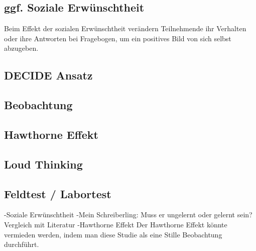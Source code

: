 \subsection{ggf. Soziale Erwünschtheit}
\grqq{}Beim Effekt der sozialen Erwünschtheit verändern Teilnehmende ihr Verhalten oder ihre Antworten bei Fragebogen, um ein positives Bild von sich selbst abzugeben.\glqq 

\subsection{DECIDE Ansatz}
\subsection{Beobachtung}
\subsection{Hawthorne Effekt}
\subsection{Loud Thinking}
\subsection{Feldtest / Labortest}

-Soziale Erwünschtheit
-Mein Schreiberling: Muss er ungelernt oder gelernt sein? Vergleich mit Literatur
-Hawthorne Effekt
Der Hawthorne Effekt könnte vermieden werden, indem man diese Studie als eine Stille Beobachtung durchführt. 
%

